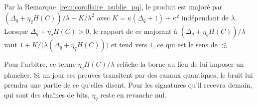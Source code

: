 \begin{sloppypar}
\begin{Preuve}
Par la Remarque~\ref{rem:corollaire_publie_pq}, le produit est major\'e par
$(\Delta_q + \eta_q H(C))/\lambda + K/\lambda^2$ avec $K = \kappa(\Delta_q+1)+\kappa^2$
ind\'ependant de $\lambda$. Lorsque $\Delta_q + \eta_q H(C) > 0$, le rapport de ce
majorant \`a $(\Delta_q + \eta_q H(C))/\lambda$ vaut
$1 + K/\bigl(\lambda(\Delta_q + \eta_q H(C))\bigr)$ et tend vers $1$, ce qui est le
sens de $\lesssim$.
\end{Preuve}

\begin{boiteArbitre}
Pour l'arbitre, ce terme $\eta_q H(C)/\lambda$ rel\^ache la borne
au lieu de lui imposer un plancher. Si un jour ses preuves
transitent par des canaux quantiques, le bruit lui prendra une partie de ce
qu'elles disent. Pour les signatures qu'il recevra demain, qui sont
des cha\^ines de bits, $\eta_q$ reste en revanche nul.
\end{boiteArbitre}
\end{sloppypar}


